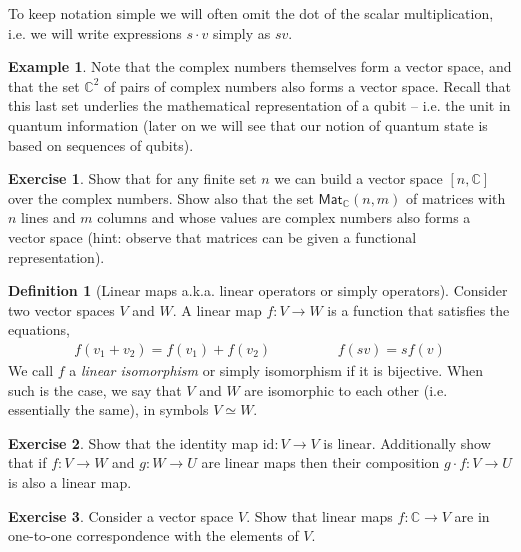 \documentclass[a4paper, 11pt]{article}
\newcommand{\complex}{\mathbb{C}}
\newcommand{\id}{\mathrm{id}}
\theoremstyle{definition}
\newtheorem{definition}{Definition}
\newtheorem{examples}{Example}
\newtheorem{exercise}{Exercise}
\begin{document}
To keep notation simple we will often omit the dot of the scalar
multiplication, i.e. we will write expressions $s \cdot v$ simply
as $s v$.

\begin{examples}
  Note that the complex numbers themselves form a vector space, and
  that the set $\complex^2$ of pairs of complex numbers also forms a
  vector space. Recall that this last set underlies the mathematical
  representation of a qubit -- i.e. the unit in quantum information
  (later on we will see that our notion of quantum state is based on
  sequences of qubits).
\end{examples}


\begin{exercise}
  Show that for any finite set $n$ we can build a vector space
  $[n,\complex]$ over the complex numbers. Show also that the set
  $\mathsf{Mat}_\complex(n,m)$ of matrices with $n$ lines and $m$
  columns and whose values are complex numbers also forms a vector
  space (hint: observe that matrices can be given a functional
  representation).
\end{exercise}

\begin{definition}[Linear maps a.k.a. linear operators or simply operators]
  Consider two vector spaces $V$ and $W$. A linear map $f : V \to W$
  is a function that satisfies the equations,
  \begin{align*}
    f(v_1 + v_2) = f (v_1) + f(v_2) \hspace{2cm}
    f (s v) = s  f(v)
  \end{align*}
  We call $f$ a \emph{linear isomorphism} or simply isomorphism if it
  is bijective.
  When such is the case, we say that $V$ and $W$ are isomorphic to each
  other (i.e. essentially the same), in symbols $V \simeq W$.
\end{definition}

\begin{exercise}
  Show that the identity map $\id : V \to V$ is linear. Additionally show
  that if $f : V \to W$ and $g : W \to U$ are linear maps then their
  composition $g \cdot f : V \to U$ is also a linear map.
\end{exercise}

\begin{exercise}
  Consider a vector space $V$. Show that linear maps
  $f : \complex \to V$ are in one-to-one correspondence with the
  elements of $V$.
\end{exercise}
\end{document}
